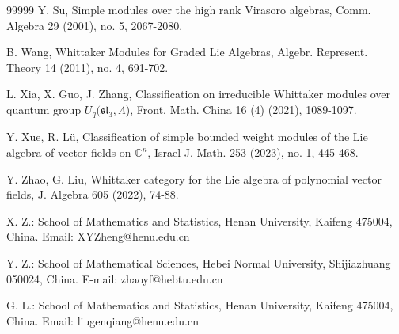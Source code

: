 \documentclass[12pt,a4paper]{amsart}
\def\sl{\mathfrak{sl}}
\begin{document}
\begin{thebibliography}{99999}
Y. Su, Simple modules over the high rank Virasoro algebras, Comm. Algebra 29 (2001), no. 5, 2067-2080.

B. Wang, Whittaker Modules for Graded Lie Algebras, Algebr. Represent. Theory 14 (2011), no. 4, 691-702.

L. Xia, X. Guo, J. Zhang, Classification on irreducible Whittaker modules over quantum group
$U_q(\sl_3,\Lambda$), Front. Math. China 16 (4) (2021), 1089-1097.

Y. Xue, R. L\"{u}, Classification of simple bounded weight modules of the Lie algebra of vector fields on $\mathbb{C}^n$, Israel J. Math. 253 (2023), no. 1, 445-468.

Y. Zhao, G. Liu, Whittaker category for the Lie algebra of polynomial vector fields, J. Algebra 605 (2022), 74-88.

\end{thebibliography}

\vspace{4mm}

 \noindent  X. Z.: School of Mathematics and Statistics,
Henan University, Kaifeng 475004, China. Email: XYZheng@henu.edu.cn

\noindent  Y. Z.: School of Mathematical Sciences, Hebei Normal University, Shijiazhuang 050024, China. E-mail: zhaoyf@hebtu.edu.cn

 \noindent G. L.: School of Mathematics and Statistics,
Henan University, Kaifeng 475004, China. Email: liugenqiang@henu.edu.cn


\vspace{0.2cm}
\end{document}
